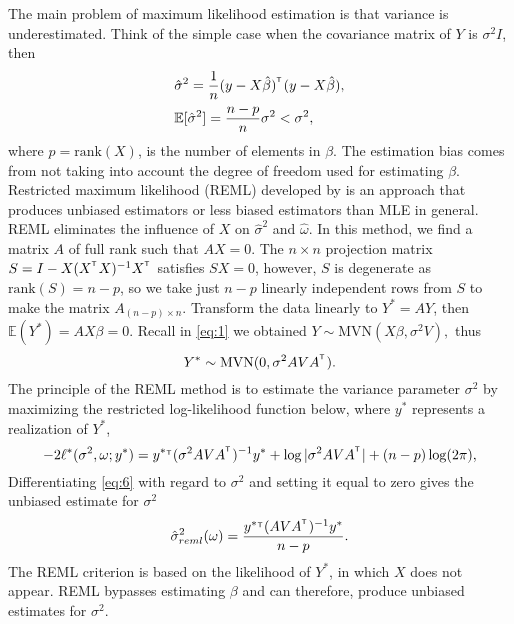 \documentclass{article}\usepackage[]{graphicx}\usepackage[]{color}
\def\MVN{{\mathrm{MVN}}}
\def\T{{\footnotesize {^{_{\sf T}}}}}
\def\E{\mathbb{E}} %
\begin{document}
The main problem of maximum likelihood estimation is that variance is underestimated. Think of the simple case when the covariance matrix of $Y$ is $\sigma^2 I$, then 
\begin{align*}
&\hat{\sigma}^2 = \frac{1}{n}(y-X\hat{\beta})^\T (y-X\hat{\beta}),\\
&\E[\hat{\sigma}^2]=\frac{n-p}{n} \sigma^2 < \sigma^2,
\end{align*}
where $p= \text{rank}(X)$, is the number of elements in $\beta$. The estimation bias comes from not taking into account the degree of freedom used for estimating $\beta$. Restricted maximum likelihood (REML) developed by \cite{patterson1971recovery} is an approach that produces unbiased estimators or less biased estimators than MLE in general. REML eliminates the influence of $X$ on $\hat{\sigma}^2$ and $\hat{\omega}$. In this method, we find a matrix $A$ of full rank such that $AX=0$. The $n \times n$ projection matrix $S= I-X(X^\T X)^{-1}X^\T$ satisfies $SX=0$, however, $S$ is degenerate as $\text{rank}(S)=n-p$, so we take just $n-p$ linearly independent rows from $S$ to make the matrix $A_{(n-p)\times n}$. Transform the data linearly to $Y^*=AY$, then $\E(Y^*)=AX\beta=0$. Recall in \eqref{eq:1} we obtained $Y \sim \MVN (X\beta, \sigma^2 V),$ thus
%
\begin{equation*}
Y^* \sim \MVN(0,\sigma^2 AVA^\T).
\end{equation*}
%
The principle of the REML method is to estimate the variance parameter $\sigma^2$ by maximizing the restricted log-likelihood function below, where $y^*$ represents a realization of $Y^*$,
\begin{equation} \label{eq:6}
-2\ell^*(\sigma^2, \omega ;y^*)=y^*\T(\sigma^2 AVA^\T)^{-1}y^*+\log|\sigma^2 AVA^\T|+(n-p)\log(2\pi),
\end{equation}
Differentiating \eqref{eq:6} with regard to $\sigma^2$ and setting it equal to zero gives the unbiased estimate for $\sigma^2$
%
\begin{gather*} %
\hat{\sigma}_{reml}^2(\omega)= \frac{y^*\T (AVA^\T)^{-1} y^*}{n-p}.
\end{gather*}
%
The REML criterion is based on the likelihood of $Y^*$, in which $X$ does not appear.  REML bypasses estimating $\beta$ and can therefore, produce unbiased estimates for $\sigma^2$.
\end{document}
